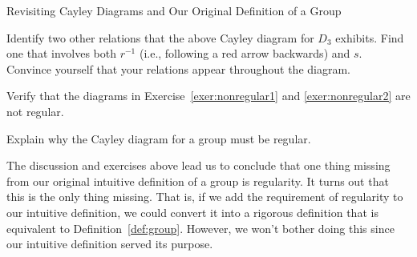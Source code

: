 \begin{section}{Revisiting Cayley Diagrams and Our Original Definition of a Group}
\begin{exercise}
Identify two other relations that the above Cayley diagram for $D_3$ exhibits.  Find one that involves both $r^{-1}$ (i.e., following a red arrow backwards) and $s$.  Convince yourself that your relations appear throughout the diagram.
\end{exercise}

\begin{exercise}
Verify that the diagrams in Exercise~\ref{exer:nonregular1} and \ref{exer:nonregular2} are not regular.
\end{exercise}

\begin{problem}
Explain why the Cayley diagram for a group must be regular.
\end{problem}

The discussion and exercises above lead us to conclude that one thing missing from our original intuitive definition of a group is regularity.  It turns out that this is the only thing missing.  That is, if we add the requirement of regularity to our intuitive definition, we could convert it into a rigorous definition that is equivalent to Definition~\ref{def:group}.  However, we won't bother doing this since our intuitive definition served its purpose.

\end{section}

